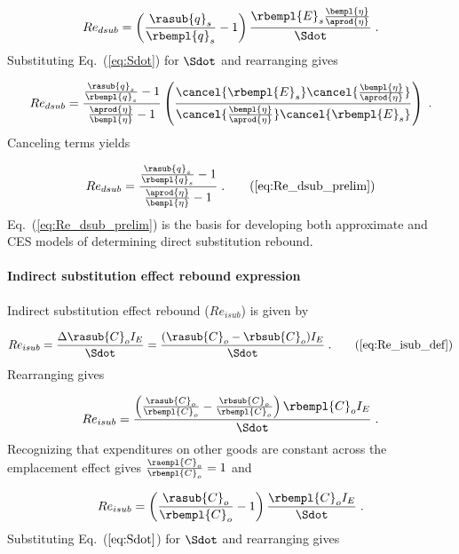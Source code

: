 \begin{equation}
  Re_{dsub} = \left( \frac{\rasub{q}_s}{\rbempl{q}_s} - 1  \right)
              \frac{\rbempl{E}_s \frac{\bempl{\eta}}{\aprod{\eta}}}{\Sdot} \; .
\end{equation}
%
Substituting Eq.~(\ref{eq:Sdot}) for $\Sdot$ and rearranging gives

\begin{equation}
  Re_{dsub} = \frac{\frac{\rasub{q}_s}{\rbempl{q}_s} - 1}{\frac{\aprod{\eta}}{\bempl{\eta}} - 1}
              \left( \frac{\cancel{\rbempl{E}_s} \cancel{\frac{\bempl{\eta}}{\aprod{\eta}}}    }{  \cancel{\frac{\bempl{\eta}}{\aprod{\eta}}}    \cancel{\rbempl{E}_s}} \right) \; .
\end{equation}
%
Canceling terms yields

\begin{equation}
  Re_{dsub} = \frac{\frac{\rasub{q}_s}{\rbempl{q}_s} - 1}{\frac{\aprod{\eta}}{\bempl{\eta}} - 1} \; .
                                                               \tag{\ref{eq:Re_dsub_prelim}}
\end{equation}
%
Eq.~(\ref{eq:Re_dsub_prelim}) is the basis for
developing both approximate and CES models of determining
direct substitution rebound.


\paragraph{Indirect substitution effect rebound expression}
\label{sec:Reisub_expression}

Indirect substitution effect rebound ($Re_{isub}$) is given by

\begin{equation}
  Re_{isub} = \frac{\Delta \rasub{C}_o I_E}{\Sdot} = \frac{(\rasub{C}_o - \rbsub{C}_{o}) I_E}{\Sdot} \; . \tag{\ref{eq:Re_isub_def}}
\end{equation}
%
Rearranging gives

\begin{equation}
  Re_{isub} = \frac{\left(\frac{\rasub{C}_o}{\rbempl{C}_o} - \frac{\rbsub{C}_o}{\rbempl{C}_o}  \right) \rbempl{C}_o I_E }{\Sdot} \; .
\end{equation}
%
Recognizing that expenditures on other goods are constant across the emplacement effect gives
$\frac{\raempl{C}_o}{\rbempl{C}_o} = 1$ and

\begin{equation}
  Re_{isub} = \left(\frac{\rasub{C}_o}{\rbempl{C}_o} - 1  \right) \frac{\rbempl{C}_o I_E }{\Sdot} \; .
\end{equation}
%
Substituting Eq.~($\ref{eq:Sdot}$) for $\Sdot$ and rearranging gives

